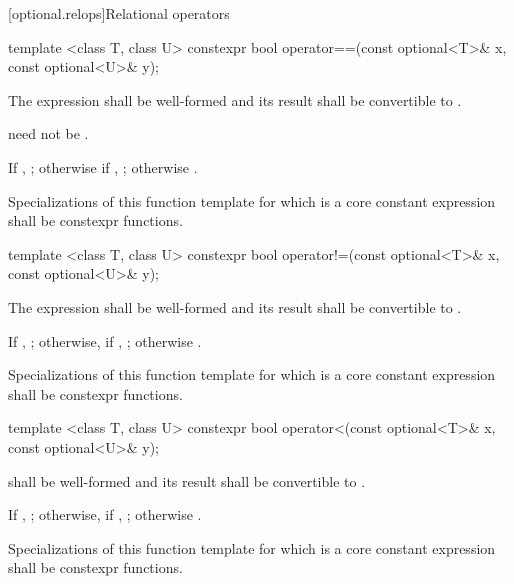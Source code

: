 [optional.relops]{Relational operators}

%
\begin{itemdecl}
template <class T, class U> constexpr bool operator==(const optional<T>& x, const optional<U>& y);
\end{itemdecl}

\begin{itemdescr}
\pnum
\requires
The expression  shall be well-formed and
its result shall be convertible to .
\begin{note}  need not be . \end{note}

\pnum
\returns
If , ; otherwise if , ; otherwise .

\pnum
\remarks
Specializations of this function template
for which  is a core constant expression
shall be constexpr functions.
\end{itemdescr}

%
\begin{itemdecl}
template <class T, class U> constexpr bool operator!=(const optional<T>& x, const optional<U>& y);
\end{itemdecl}

\begin{itemdescr}
\pnum
\requires
The expression  shall be well-formed and
its result shall be convertible to .

\pnum
\returns
If , ;
otherwise, if , ;
otherwise .

\pnum
\remarks
Specializations of this function template
for which  is a core constant expression
shall be constexpr functions.
\end{itemdescr}

%
\begin{itemdecl}
template <class T, class U> constexpr bool operator<(const optional<T>& x, const optional<U>& y);
\end{itemdecl}

\begin{itemdescr}
\pnum
\requires
{} shall be well-formed
and its result shall be convertible to .

\pnum
\returns
If , ;
otherwise, if , ;
otherwise .

\pnum
\remarks
Specializations of this function template
for which  is a core constant expression
shall be constexpr functions.
\end{itemdescr}

